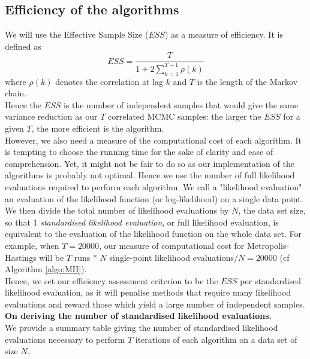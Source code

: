 \documentclass[11pt,a4paper]{report}\usepackage[]{graphicx}\usepackage[]{color}
\begin{document}
\subsection{Efficiency of the algorithms}

We will use the Effective Sample Size ($ESS$) as a measure of efficiency. It is defined as
$$ESS=\frac{T}{1+2\sum_{k=1}^{T-1}\rho(k)}$$
where $\rho(k)$ denotes the correlation at lag $k$ and $T$ is the length of the Markov chain.\\
Hence the $ESS$ is the number of independent samples that would give the same variance reduction as our $T$ correlated MCMC samples: the larger the $ESS$ for a given $T$, the more efficient is the algorithm.\\
However, we also need a measure of the computational cost of each algorithm. It is tempting to choose the running time for the sake of clarity and ease of comprehension. Yet, it might not be fair to do so as our implementation of the algorithms is probably not optimal. Hence we use the number of full likelihood evaluations required to perform each algorithm. We call a "likelihood evaluation" an evaluation of the likelihood function (or log-likelihood) on a single data point. We then divide the total number of likelihood evaluations by $N$, the data set size, so that 1 \textit{standardised likelihood evaluation}, or full likelihood evaluation, is equivalent to the evaluation of the likelihood function on the whole data set. For example, when $T=20000$, our measure of computational cost for Metropolis-Hastings will be $T$ runs * $N$ single-point likelihood evaluations/$N=20000$ (cf Algorithm \ref{algo:MH}).\\
Hence, we set our efficiency assessment criterion to be the $ESS$ per standardised likelihood evaluation, as it will penalise methods that require many likelihood evaluations and reward those which yield a large number of independent samples.\\

\noindent\textbf{On deriving the number of standardised likelihood evaluations.}\\
We provide a summary table giving the number of standardised likelihood evaluations necessary to perform $T$ iterations of each algorithm on a data set of size $N$.
\end{document}

